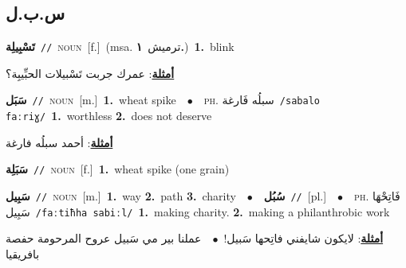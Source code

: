 \documentclass[10pt,a4paper,twoside]{article} %
\begin{document}
\begin{multicols}{2}
\vspace{-3mm}
\subsection*{\color{blue}\foreignlanguage{arabic}{س.ب.ل}\color{blue}{}} 

{\setlength\topsep{0pt}\textbf{\foreignlanguage{arabic}{تَسْبِيلِة}}\ {\color{gray}\texttt{//}\color{black}}\ \textsc{noun}\ [f.]\ \color{gray}(msa. \foreignlanguage{arabic}{ترميش}~\foreignlanguage{arabic}{\textbf{١.}})\color{black}\ \textbf{1.}~blink\  \begin{flushright}\color{gray}\foreignlanguage{arabic}{\textbf{\underline{\foreignlanguage{arabic}{أمثلة}}}: عمرك جربت تَسْبيلات الحبِّيبِة؟}\end{flushright}\color{black}} \vspace{2mm}

{\setlength\topsep{0pt}\textbf{\foreignlanguage{arabic}{سَبَل}}\ {\color{gray}\texttt{//}\color{black}}\ \textsc{noun}\ [m.]\ \textbf{1.}~wheat spike\ \ $\bullet$\ \ \textsc{ph.} \color{gray} \foreignlanguage{arabic}{سبلُه فَارغة}\color{black}\ {\color{gray}\texttt{/{\sffamily sabalo faːriɣ}/}\color{black}}\ \textbf{1.}~worthless  \textbf{2.}~does not deserve\  \begin{flushright}\color{gray}\foreignlanguage{arabic}{\textbf{\underline{\foreignlanguage{arabic}{أمثلة}}}: أحمد سبلُه فارغة}\end{flushright}\color{black}} \vspace{2mm}

{\setlength\topsep{0pt}\textbf{\foreignlanguage{arabic}{سَبَلِة}}\ {\color{gray}\texttt{//}\color{black}}\ \textsc{noun}\ [f.]\ \textbf{1.}~wheat spike (one grain)\ } \vspace{2mm}

{\setlength\topsep{0pt}\textbf{\foreignlanguage{arabic}{سَبِيل}}\ {\color{gray}\texttt{//}\color{black}}\ \textsc{noun}\ [m.]\ \textbf{1.}~way  \textbf{2.}~path  \textbf{3.}~charity\ \ $\bullet$\ \ \setlength\topsep{0pt}\textbf{\foreignlanguage{arabic}{سُبُل}}\ {\color{gray}\texttt{//}\color{black}}\ [pl.]\ \ $\bullet$\ \ \textsc{ph.} \color{gray} \foreignlanguage{arabic}{فَاتِحْهَا سَبِيل}\color{black}\ {\color{gray}\texttt{/{\sffamily faːtiħha sabiːl}/}\color{black}}\ \textbf{1.}~making charity.  \textbf{2.}~making a philanthrobic work\  \begin{flushright}\color{gray}\foreignlanguage{arabic}{\textbf{\underline{\foreignlanguage{arabic}{أمثلة}}}: لايكون شايفني فاتِحها سَبيل!\ $\bullet$\ \  عملنا بير مي سَبيل عروح المرحومة حفصة بافريقيا}\end{flushright}\color{black}} \vspace{2mm}


\end{multicols}
\end{document}

